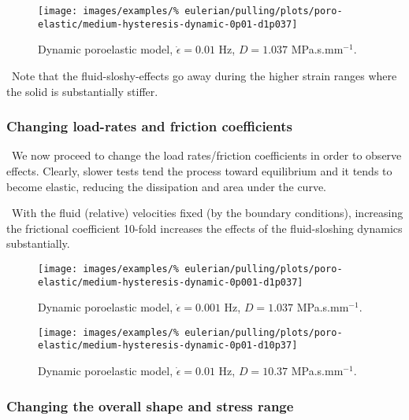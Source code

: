 \begin{figure}[!hptb]
\centering
\texttt{[image: images/examples/\%
eulerian/pulling/plots/poro-elastic/medium-hysteresis-dynamic-0p01-d1p037]}
\caption{Dynamic poroelastic model, $\dot{\epsilon}=0.01$ Hz, $D=1.037$
  MPa.s.mm$^{-1}$.}
\label{medium-hysteresis-dynamic-0p01-d1p037}
\end{figure}

\textbullet\ Note that the fluid-sloshy-effects go away during the
higher strain ranges where the solid is substantially stiffer.

\subsubsection{Changing load-rates and friction coefficients}
\label{load-rates-and-friction-coefficients}

\textbullet\ We now proceed to change the load rates/friction
coefficients in order to observe effects. Clearly, slower tests tend
the process toward equilibrium and it tends to become elastic,
reducing the dissipation and area under the curve.

\textbullet\ With the fluid (relative) velocities fixed (by the
boundary conditions), increasing
the frictional coefficient 10-fold increases the effects of the
fluid-sloshing dynamics substantially.

\begin{figure}[!hptb]
\centering
\texttt{[image: images/examples/\%
eulerian/pulling/plots/poro-elastic/medium-hysteresis-dynamic-0p001-d1p037]}
\caption{Dynamic poroelastic model, $\dot{\epsilon}=0.001$ Hz, $D=1.037$
  MPa.s.mm$^{-1}$.}
\label{medium-hysteresis-dynamic-0p001-d1p037}
\end{figure}

\begin{figure}[!hptb]
\centering
\texttt{[image: images/examples/\%
eulerian/pulling/plots/poro-elastic/medium-hysteresis-dynamic-0p01-d10p37]}
\caption{Dynamic poroelastic model, $\dot{\epsilon}=0.01$ Hz, $D=10.37$
  MPa.s.mm$^{-1}$.}
\label{medium-hysteresis-dynamic-0p01-d10p37}
\end{figure}

\subsubsection{Changing the overall shape and stress range}
\label{changing-shape}

